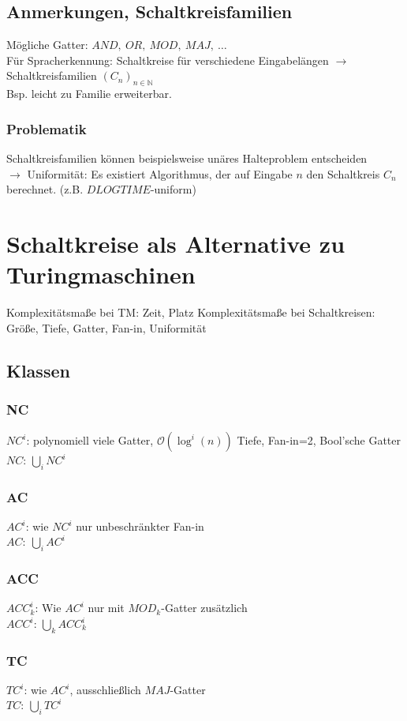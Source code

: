     \subsection{Anmerkungen, Schaltkreisfamilien}
        Mögliche Gatter: $AND,\ OR,\ MOD,\ MAJ,\ \dots$\\
        Für Spracherkennung: Schaltkreise für verschiedene Eingabelängen $\rightarrow$ Schaltkreisfamilien $\left(C_n\right)_{n\in\mathds{N}}$\\
        Bsp. leicht zu Familie erweiterbar.
        \subsubsection{Problematik}
            Schaltkreisfamilien können beispielsweise unäres Halteproblem entscheiden\\$\rightarrow$ Uniformität: Es existiert Algorithmus, der auf Eingabe $n$ den Schaltkreis $C_n$ berechnet. (z.B. $DLOGTIME$-uniform)
\section{Schaltkreise als Alternative zu Turingmaschinen}
    Komplexitätsmaße bei TM: Zeit, Platz
    Komplexitätsmaße bei Schaltkreisen: Größe, Tiefe, Gatter, Fan-in, Uniformität
    \subsection{Klassen}
        \subsubsection{NC}
            $NC^i$: polynomiell viele Gatter, $\mathcal{O}\left(\log^i(n)\right)$ Tiefe, Fan-in=2, Bool'sche Gatter\\
            $NC$: $\bigcup\limits_i NC^i$
        \subsubsection{AC}
            $AC^i$: wie $NC^i$ nur unbeschränkter Fan-in\\
            $AC:\ \bigcup\limits_i AC^i$
        \subsubsection{ACC}
            $ACC^i_k$: Wie $AC^i$ nur mit $MOD_k$-Gatter zusätzlich\\
            $ACC^i$: $\bigcup\limits_k ACC^i_k$
        \subsubsection{TC}
            $TC^i$: wie $AC^i$, ausschließlich $MAJ$-Gatter\\
            $TC:\ \bigcup\limits_i TC^i$
